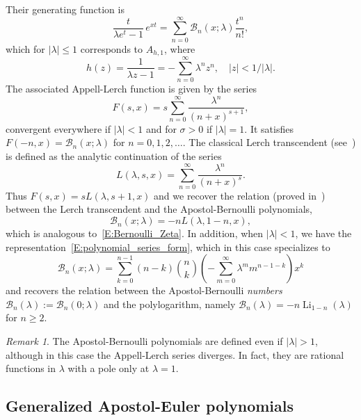 \documentclass[11pt,a4paper]{amsart}
\newcommand{\AB}{\mathcal{B}}
\theoremstyle{plain}
\theoremstyle{plain}
\theoremstyle{definition}
\theoremstyle{remark}
\newtheorem*{remark}{Remark}
\begin{document}
Their generating function is
% 
\begin{equation*}
	\frac{t}{\lambda e^t-1}\,e^{xt} = \sum_{n=0}^\infty \AB_{n}(x;\lambda)\frac{t^n}{n!},
\end{equation*}
% 
which for $|\lambda|\leq 1$ corresponds to $A_{h,1}$, where
\[
  h(z)=\frac{1}{\lambda z-1}=-\sum_{n=0}^\infty \lambda^n z^n,\quad |z|<1/|\lambda|.
\]
The associated Appell-Lerch function is given by the series
% 
\begin{equation*}
  F(s,x) = s\sum_{n=0}^\infty \frac{\lambda^n}{(n + x)^{s+1}},
\end{equation*}
% 
convergent everywhere if $|\lambda| < 1$ and for $\sigma>0$ if $|\lambda| = 1$. It
satisfies
$
	F(-n,x) = \AB_{n}(x;\lambda)
$
for $n = 0,1,2,\dots$. The classical Lerch transcendent (see~\cite{Ap}) is defined as the analytic continuation of the series
% 
\begin{equation}
\label{E:Lerch}
	L(\lambda,s,x) = \sum_{n=0}^\infty \frac{\lambda^n}{(n + x)^{s}}.
\end{equation}
% 
Thus $F(s,x)=s L(\lambda,s+1,x)$ and we recover the relation (proved in~\cite{Ap}) between the Lerch transcendent and the Apostol-Bernoulli polynomials,
\[
	\AB_{n}(x;\lambda) = -n L(\lambda,1-n,x),
\]
which is analogous to~\eqref{E:Bernoulli_Zeta}. In addition, when $|\lambda| < 1$, we have the representation~\eqref{E:polynomial_series_form}, which in this case specializes to
\[
	  \AB_{n}(x;\lambda) 
	= \sum_{k=0}^{n-1} (n-k) \binom{n}{k} \left(- \sum_{m=0}^{\infty} \lambda^{m} m^{n-1-k}\right)  x^{k}
\]
and recovers the relation between the Apostol-Bernoulli \emph{numbers} $\AB_{n}(\lambda) := \AB_{n}(0;\lambda)$ and the polylogarithm, namely $\AB_{n}(\lambda) = -n \operatorname{Li}_{1-n}(\lambda)$ for $n \geq 2$.

\begin{remark}
The Apostol-Bernoulli polynomials are defined even if $|\lambda| > 1$, although in this case the Appell-Lerch series diverges. In fact, they are rational functions in $\lambda$ with a pole only at $\lambda = 1$.
\end{remark}



\subsection{Generalized Apostol-Euler polynomials}
\end{document}
